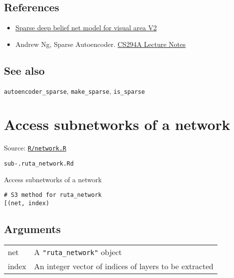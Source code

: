 \hypertarget{references}{\subsection{\texorpdfstring{\protect\hyperlink{references}{}References}{References}}\label{references}}

\begin{itemize}
\item
  \href{http://papers.nips.cc/paper/3313-sparse-deep-belief-net-model-for-visual-area-v2}{Sparse
  deep belief net model for visual area V2}
\item
  Andrew Ng, Sparse Autoencoder.
  \href{https://web.stanford.edu/class/cs294a/sparseAutoencoder_2011new.pdf}{CS294A
  Lecture Notes}
\end{itemize}

\hypertarget{see-also}{\subsection{\texorpdfstring{\protect\hyperlink{see-also}{}See
also}{See also}}\label{see-also}}

\texttt{autoencoder\_sparse}, \texttt{make\_sparse}, \texttt{is\_sparse}

\section{Access subnetworks of a
network}\label{access-subnetworks-of-a-network}

Source:
\href{https://github.com/fdavidcl/ruta/blob/master/R/network.R}{\texttt{R/network.R}}

\texttt{sub-.ruta\_network.Rd}

Access subnetworks of a network

\begin{verbatim}
# S3 method for ruta_network
[(net, index)
\end{verbatim}

\hypertarget{arguments}{\subsection{\texorpdfstring{\protect\hyperlink{arguments}{}Arguments}{Arguments}}\label{arguments}}

\begin{longtable}[c]{@{}ll@{}}
\toprule
net & A \texttt{"ruta\_network"} object\tabularnewline
index & An integer vector of indices of layers to be
extracted\tabularnewline
\bottomrule
\end{longtable}

